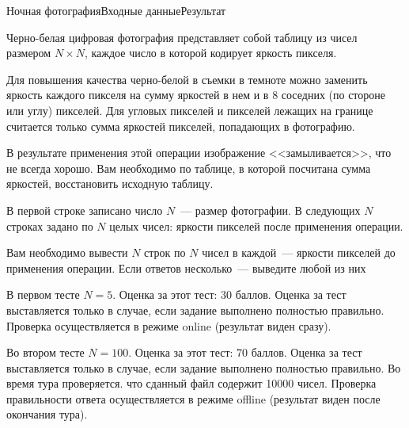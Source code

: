 \begin{problem}{Ночная фотография}{Входные данные}{Результат}{}

Черно-белая цифровая фотография представляет собой таблицу из чисел размером $N\times N$, каждое число в которой кодирует яркость пикселя.

Для повышения качества черно-белой в съемки в темноте можно заменить яркость каждого пикселя на сумму яркостей в нем и в 8 соседних (по стороне или углу) пикселей. Для угловых пикселей и пикселей лежащих на границе считается только сумма яркостей пикселей, попадающих в фотографию.

В результате применения этой операции изображение <<замыливается>>, что не всегда хорошо. Вам необходимо по таблице, в которой посчитана сумма яркостей, восстановить исходную таблицу.

В первой строке записано число $N$~--- размер фотографии. В следующих $N$ строках задано по $N$ целых чисел: яркости пикселей после применения операции.

Вам необходимо вывести $N$ строк по $N$ чисел в каждой~--- яркости пикселей до применения операции. Если ответов несколько~--- выведите любой из них

В первом тесте $N = 5$. Оценка за этот тест: 30 баллов. Оценка за тест выставляется только в случае, если задание выполнено полностью правильно. Проверка осуществляется в режиме online (результат виден сразу).

Во втором тесте $N = 100$. Оценка за этот тест: 70 баллов. Оценка за тест выставляется только в случае, если задание выполнено полностью правильно. Во время тура проверяется. что сданный файл содержит 10000 чисел. Проверка правильности ответа осуществляется в режиме offline (результат виден после окончания тура).

\Examples
\begin{example}
%
\end{example}

\end{problem} 